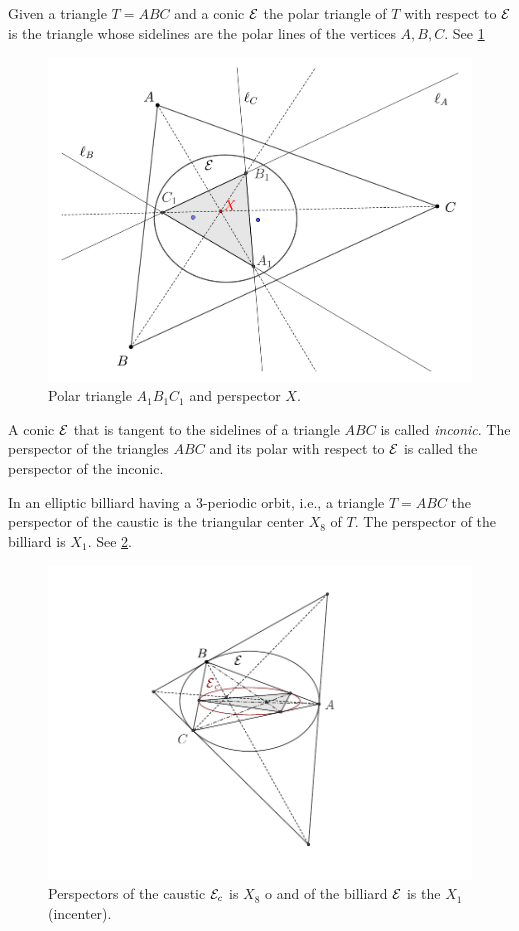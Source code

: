 Given a triangle $T=ABC$ and a conic $\mathcal{E}$ the polar triangle of $T$ with respect to $\mathcal{E}$ is the triangle whose sidelines are the polar lines of the vertices   $A,B,C$. See \cref{fig:appA-polar-triangle}
\begin{figure}
    \centering
    \includegraphics[scale=0.3]{zappA/pics/pics-appA-150-perspector-triangle-ellipse.pdf}
    \caption{Polar triangle $A_1B_1C_1$ and perspector $X$.}
    \label{fig:appA-polar-triangle}
\end{figure}

A conic $\mathcal{E}$ that is tangent to the sidelines of a triangle $ABC$ is called {\em inconic}. The perspector of the triangles $ABC$ and its polar with respect to $\mathcal{E}$ is called the perspector of the inconic.

In   an elliptic  billiard having a 3-periodic orbit, i.e., a triangle $T=ABC$ the perspector of the caustic is the triangular center $X_8$ of $T$. The perspector of the billiard is $X_1$. See \cref{fig:appA-X8-X1-perspectors}.
\begin{figure}
    \centering
    \includegraphics[scale=0.7]{zappA/pics/pics-appA-170-inconic-billiardggb.pdf}
    \caption{Perspectors of the caustic $\mathcal{E}_c$ is $X_8$ o and of the billiard $\mathcal{E}$ is the $X_1$ (incenter). }
    \label{fig:appA-X8-X1-perspectors}
\end{figure}

